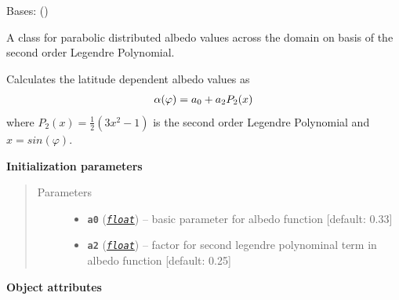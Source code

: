 \documentclass[a4paper,10pt,english]{sphinxmanual}
\begin{document}
\begin{fulllineitems}
\label{api/climlab.surface:climlab.surface.albedo.P2Albedo}
Bases: {\hyperref[api/climlab.process:climlab.process.diagnostic.DiagnosticProcess]{\emph{}}} ()

A class for parabolic distributed albedo values across the domain 
on basis of the second order Legendre Polynomial.

Calculates the latitude dependent albedo values as
\begin{gather}
\begin{split}\alpha(\varphi) = a_0 + a_2 P_2(x)\end{split}\notag
\end{gather}
where \(P_2(x) = \frac{1}{2} (3x^2 - 1)\) is the second order Legendre Polynomial
and \(x=sin(\varphi)\).

\textbf{Initialization parameters}
\begin{quote}\begin{description}
\item[{Parameters}] \leavevmode\begin{itemize}
\item {} 
\textbf{\texttt{a0}} (\href{http://docs.python.org/2.7/library/functions.html\#float}{\emph{\texttt{float}}}) -- basic parameter for albedo function {[}default: 0.33{]}

\item {} 
\textbf{\texttt{a2}} (\href{http://docs.python.org/2.7/library/functions.html\#float}{\emph{\texttt{float}}}) -- factor for second legendre polynominal term in albedo 
function {[}default: 0.25{]}

\end{itemize}

\end{description}\end{quote}

\textbf{Object attributes}


\end{fulllineitems}
\end{document}
